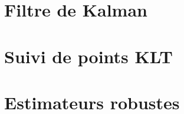 \chapter{Filtre de Kalman}
\label{sec:Annexe_kalman}


\chapter{Suivi de points KLT}
\label{sec:Annexe_klt}


\chapter{Estimateurs robustes}
\label{sec:Annexe_robust}



%